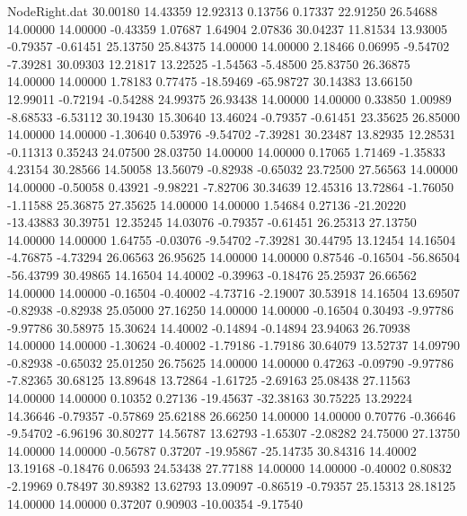 \begin{filecontents}{NodeRight.dat}
  30.00180   14.43359   12.92313     0.13756    0.17337   22.91250   26.54688   14.00000   14.00000   -0.43359    1.07687    1.64904    2.07836
  30.04237   11.81534   13.93005    -0.79357   -0.61451   25.13750   25.84375   14.00000   14.00000    2.18466    0.06995   -9.54702   -7.39281
  30.09303   12.21817   13.22525    -1.54563   -5.48500   25.83750   26.36875   14.00000   14.00000    1.78183    0.77475  -18.59469  -65.98727
  30.14383   13.66150   12.99011    -0.72194   -0.54288   24.99375   26.93438   14.00000   14.00000    0.33850    1.00989   -8.68533   -6.53112
  30.19430   15.30640   13.46024    -0.79357   -0.61451   23.35625   26.85000   14.00000   14.00000   -1.30640    0.53976   -9.54702   -7.39281
  30.23487   13.82935   12.28531    -0.11313    0.35243   24.07500   28.03750   14.00000   14.00000    0.17065    1.71469   -1.35833    4.23154
  30.28566   14.50058   13.56079    -0.82938   -0.65032   23.72500   27.56563   14.00000   14.00000   -0.50058    0.43921   -9.98221   -7.82706
  30.34639   12.45316   13.72864    -1.76050   -1.11588   25.36875   27.35625   14.00000   14.00000    1.54684    0.27136  -21.20220  -13.43883
  30.39751   12.35245   14.03076    -0.79357   -0.61451   26.25313   27.13750   14.00000   14.00000    1.64755   -0.03076   -9.54702   -7.39281
  30.44795   13.12454   14.16504    -4.76875   -4.73294   26.06563   26.95625   14.00000   14.00000    0.87546   -0.16504  -56.86504  -56.43799
  30.49865   14.16504   14.40002    -0.39963   -0.18476   25.25937   26.66562   14.00000   14.00000   -0.16504   -0.40002   -4.73716   -2.19007
  30.53918   14.16504   13.69507    -0.82938   -0.82938   25.05000   27.16250   14.00000   14.00000   -0.16504    0.30493   -9.97786   -9.97786
  30.58975   15.30624   14.40002    -0.14894   -0.14894   23.94063   26.70938   14.00000   14.00000   -1.30624   -0.40002   -1.79186   -1.79186
  30.64079   13.52737   14.09790    -0.82938   -0.65032   25.01250   26.75625   14.00000   14.00000    0.47263   -0.09790   -9.97786   -7.82365
  30.68125   13.89648   13.72864    -1.61725   -2.69163   25.08438   27.11563   14.00000   14.00000    0.10352    0.27136  -19.45637  -32.38163
  30.75225   13.29224   14.36646    -0.79357   -0.57869   25.62188   26.66250   14.00000   14.00000    0.70776   -0.36646   -9.54702   -6.96196
  30.80277   14.56787   13.62793    -1.65307   -2.08282   24.75000   27.13750   14.00000   14.00000   -0.56787    0.37207  -19.95867  -25.14735
  30.84316   14.40002   13.19168    -0.18476    0.06593   24.53438   27.77188   14.00000   14.00000   -0.40002    0.80832   -2.19969    0.78497
  30.89382   13.62793   13.09097    -0.86519   -0.79357   25.15313   28.18125   14.00000   14.00000    0.37207    0.90903  -10.00354   -9.17540

\end{filecontents}
